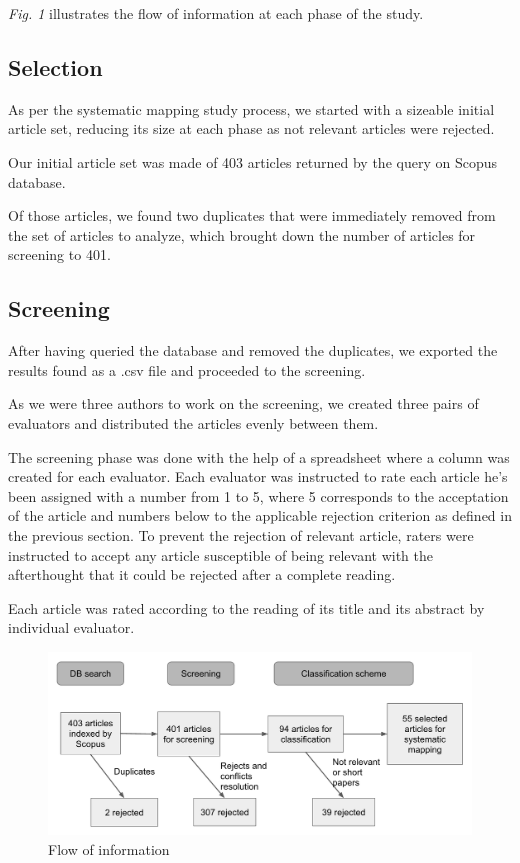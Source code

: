 \documentclass[letterpaper, 10 pt, conference]{ieeeconf}  %
\begin{document}
\textit{Fig. 1} illustrates the flow of information at each phase of the study.

\subsection{Selection}

As per the systematic mapping study process, we started with a sizeable initial
article set, reducing its size at each phase as not relevant articles were rejected.

Our initial article set was made of 403 articles returned by the query on Scopus
database.

Of those articles, we found two duplicates that were immediately removed from
the set of articles to analyze, which brought down the number of articles for
screening to 401.

\subsection{Screening}

After having queried the database and removed the duplicates, we exported the
results found as a .csv file and proceeded to the screening.

As we were three authors to work on the screening, we created three pairs
of evaluators and distributed the articles evenly between them.

The screening phase was done with the help of a spreadsheet where a column was
created for each evaluator.
Each evaluator was instructed to rate each article he's been assigned with a number
from 1 to 5, where 5 corresponds to the acceptation of the article and numbers below
to the applicable rejection criterion as defined in the previous section.
To prevent the rejection of relevant article, raters were instructed to accept
any article susceptible of being relevant with the afterthought that it could be
rejected after a complete reading.

Each article was rated according to the reading of its title and its abstract by
individual evaluator.

\begin{figure}[tb]
 \centering
 \includegraphics[scale=0.5]{flow.png}
 \caption{Flow of information}
\end{figure}
\end{document}
